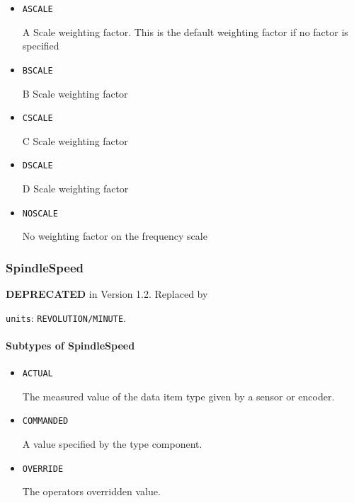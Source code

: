 \begin{itemize}

\item \texttt{A\textunderscore SCALE}


A Scale weighting factor.   This is the default weighting factor if no factor is specified

\item \texttt{B\textunderscore SCALE}


B Scale weighting factor

\item \texttt{C\textunderscore SCALE}


C Scale weighting factor

\item \texttt{D\textunderscore SCALE}


D Scale weighting factor

\item \texttt{NO\textunderscore SCALE}


No weighting factor on the frequency scale


\end{itemize}








\subsubsection{SpindleSpeed}
\label{sec:SpindleSpeed}



\textbf{DEPRECATED} in Version 1.2.  Replaced by 


\texttt{units}: \texttt{REVOLUTION/MINUTE}.

\paragraph{Subtypes of SpindleSpeed}\mbox{}
\label{sec:Subtypes of SpindleSpeed}

\begin{itemize}

\item \texttt{ACTUAL}


The measured value of the data item type given by a sensor or encoder.

\item \texttt{COMMANDED}


A value specified by the  type component.

\item \texttt{OVERRIDE}


The operators overridden value.


\end{itemize}







